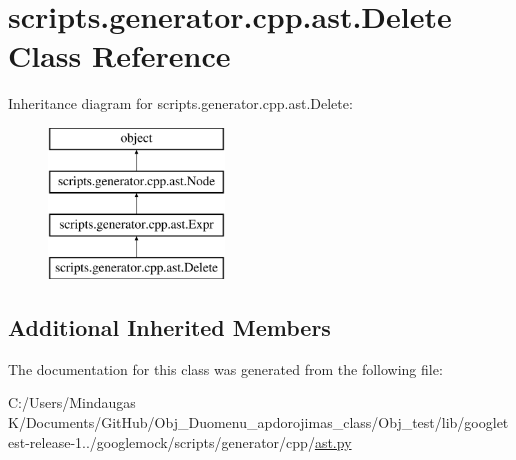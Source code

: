 \hypertarget{classscripts_1_1generator_1_1cpp_1_1ast_1_1_delete}{}\section{scripts.\+generator.\+cpp.\+ast.\+Delete Class Reference}
\label{classscripts_1_1generator_1_1cpp_1_1ast_1_1_delete}
Inheritance diagram for scripts.\+generator.\+cpp.\+ast.\+Delete\+:\begin{figure}[H]
\begin{center}
\leavevmode
\includegraphics[height=4.000000cm]{d1/df9/classscripts_1_1generator_1_1cpp_1_1ast_1_1_delete}
\end{center}
\end{figure}
\subsection*{Additional Inherited Members}


The documentation for this class was generated from the following file\+:\begin{DoxyCompactItemize}
\item 
C\+:/\+Users/\+Mindaugas K/\+Documents/\+Git\+Hub/\+Obj\+\_\+\+Duomenu\+\_\+apdorojimas\+\_\+class/\+Obj\+\_\+test/lib/googletest-\/release-\/1../googlemock/scripts/generator/cpp/\mbox{\hyperlink{_obj__test_2lib_2googletest-release-1_88_81_2googlemock_2scripts_2generator_2cpp_2ast_8py}{ast.\+py}}\end{DoxyCompactItemize}
